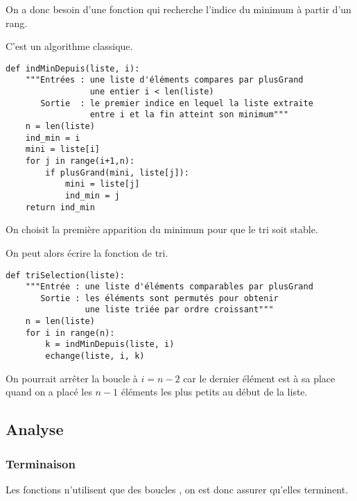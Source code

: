 On a donc besoin d'une fonction qui recherche l'indice du minimum à partir d'un rang.

C'est un algorithme classique.
\begin{lstlisting}
def indMinDepuis(liste, i):
    """Entrées : une liste d'éléments compares par plusGrand
                 une entier i < len(liste)
       Sortie  : le premier indice en lequel la liste extraite
                 entre i et la fin atteint son minimum"""
    n = len(liste)
    ind_min = i
    mini = liste[i]
    for j in range(i+1,n):
        if plusGrand(mini, liste[j]):
            mini = liste[j]
            ind_min = j
    return ind_min 
\end{lstlisting}
On choisit la première apparition du minimum pour que le tri soit stable.

\medskip

On peut alors écrire la fonction de tri.
\begin{lstlisting}
def triSelection(liste):
    """Entrée : une liste d'éléments comparables par plusGrand
       Sortie : les éléments sont permutés pour obtenir
                une liste triée par ordre croissant"""
    n = len(liste)
    for i in range(n):
        k = indMinDepuis(liste, i)
        echange(liste, i, k)
\end{lstlisting}
On pourrait arrêter la boucle à $i=n-2$ car le dernier élément est à sa place quand on a placé les $n-1$ éléments les plus petits au début de la liste.
\subsection{Analyse}
\subsubsection{Terminaison}
Les fonctions n'utilisent que des boucles , on est donc assurer qu'elles terminent.

